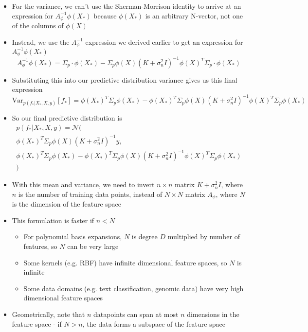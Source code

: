 \documentclass[12pt]{article}
\begin{document}
\begin{itemize}
    \item For the variance, we can't use the Sherman-Morrison identity to arrive at an expression for $A_{\phi}^{-1}\phi(X_*)$ because $\phi(X_*)$ is an arbitrary N-vector, not one of the columns of $\phi(X)$
    \item Instead, we use the $A_{\phi}^{-1}$ expression we derived earlier to get an expression for $A_{\phi}^{-1}\phi(X_*)$
\begin{equation}
    A_{\phi}^{-1}\phi(X_*) = \Sigma_p \cdot \phi(X_*) - \Sigma_p\phi(X)(K+\sigma_n^2I)^{-1}\phi(X)^T\Sigma_p \cdot \phi(X_*)
\end{equation}
    \item Substituting this into our predictive distribution variance gives us this final expression
\begin{equation}
    \text{Var}_{p(f_*|X_*,X,y)}[f_*] = \phi(X_*)^T\Sigma_p\phi(X_*) - \phi(X_*)^T\Sigma_p\phi(X)(K+\sigma_n^2I)^{-1}\phi(X)^T\Sigma_p\phi(X_*)
\end{equation}
    \item So our final predictive distribution is
\begin{equation*}
    \begin{aligned}
        p(f_*|X_*,X,y) = \mathcal{N}( \\
        \phi(X_*)^T\Sigma_p\phi(X)(K+\sigma_n^2I)^{-1}y , \\
        \phi(X_*)^T\Sigma_p\phi(X_*) - \phi(X_*)^T\Sigma_p\phi(X)(K+\sigma_n^2I)^{-1}\phi(X)^T\Sigma_p\phi(X_*) \\
        )
    \end{aligned}
\end{equation*}
    \item With this mean and variance, we need to invert $n \times n$ matrix $K + \sigma_n^2I$, where $n$ is the number of training data points, instead of $N \times N$ matrix $A_{\phi}$, where $N$ is the dimension of the feature space
    \item This formulation is faster if $n < N$
        \begin{itemize}
            \item For polynomial basis expansions, $N$ is degree $D$ multiplied by number of features, so $N$ can be very large
            \item Some kernels (e.g. RBF) have infinite dimensional feature spaces, so $N$ is infinite
            \item Some data domains (e.g. text classification, genomic data) have very high dimensional feature spaces
        \end{itemize}
    \item Geometrically, note that $n$ datapoints can span at most $n$ dimensions in the feature space - if $N > n$, the data forms a subspace of the feature space
\end{itemize}
\end{document}
